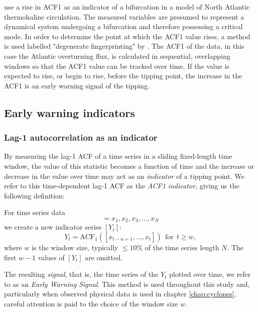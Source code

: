 {\citet{held2004} use a rise in ACF1 as an indicator of a bifurcation in a model of North Atlantic thermohaline circulation. The measured variables are presumed to represent a dynamical system undergoing a bifurcation and therefore possessing a critical mode. In order to determine the point at which the ACF1 value rises, a method is used labelled "degenerate fingerprinting" by \citet{held2004}. The ACF1 of the data, in this case the Atlantic overturning flux, is calculated in sequential, overlapping windows so that the ACF1 value can be tracked over time. If the value is expected to rise, or begin to rise, before the tipping point, the increase in the ACF1 is an early warning signal of the tipping. 


\subsection{Early warning indicators}
\label{subsec:1D:Exponents_as_EWS:indicators}

\subsubsection{Lag-1 autocorrelation as an indicator}
{\Red
By measuring the lag-1 ACF of a time series in a sliding fixed-length time window, the value of this statistic becomes a function of time and the increase or decrease in the value over time may act as an \emph{indicator} of a tipping point. We refer to this time-dependent lag-1 ACF as the \emph{ACF1 indicator}, giving us the following definition:
}
\begin{definition} 
	\label{def:1D:indicator:ACF1}
	For time series data 
	\begin{equation}
		[x_t] = x_1, x_2, x_3, ..., x_N
	\end{equation}
	we create a new indicator series $[Y_t]$:
	\begin{equation}
	\label{eqn:1D:ACFfingerprinting}
		Y_t = \text{ACF}_1([x_{t-w+1},...,x_t]) ~~\text{for}~~t\geq w,
	\end{equation}
	where $w$ is the window size, typically $\leq 10\%$ of the time series length $N$. The first $w-1$ values of $[Y_t]$ are omitted. 
\end{definition}
{\Red The resulting \emph{signal}, that is, the time series of the $Y_t$ plotted over time, we refer to as an \emph{Early Warning Signal}. This method is used throughout this study and, particularly when observed physical data is used in chapter \ref{chap:cyclones}, careful attention is paid to the choice of the window size $w$. }

}
